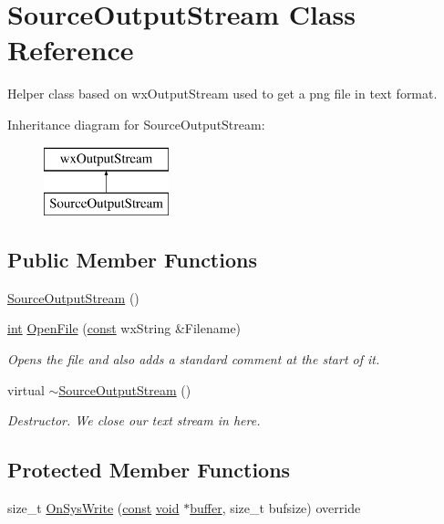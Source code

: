 \hypertarget{class_source_output_stream}{}\section{Source\+Output\+Stream Class Reference}
\label{class_source_output_stream}


Helper class based on wx\+Output\+Stream used to get a png file in text format.  


Inheritance diagram for Source\+Output\+Stream\+:\begin{figure}[H]
\begin{center}
\leavevmode
\includegraphics[height=2.000000cm]{class_source_output_stream}
\end{center}
\end{figure}
\subsection*{Public Member Functions}
\begin{DoxyCompactItemize}
\item 
\hyperlink{class_source_output_stream_a50b63abf252028635e21ec023ea20be6}{Source\+Output\+Stream} ()
\item 
\hyperlink{xmltok_8h_a5a0d4a5641ce434f1d23533f2b2e6653}{int} \hyperlink{class_source_output_stream_a5f00474aad7b930f29f3f8e42411a8a0}{Open\+File} (\hyperlink{getopt1_8c_a2c212835823e3c54a8ab6d95c652660e}{const} wx\+String \&Filename)
\begin{DoxyCompactList}\small\item\em Opens the file and also adds a standard comment at the start of it. \end{DoxyCompactList}\item 
virtual \hyperlink{class_source_output_stream_aab99721105b1c0ce232e161b06f9135d}{$\sim$\+Source\+Output\+Stream} ()
\begin{DoxyCompactList}\small\item\em Destructor. We close our text stream in here. \end{DoxyCompactList}\end{DoxyCompactItemize}
\subsection*{Protected Member Functions}
\begin{DoxyCompactItemize}
\item 
size\+\_\+t \hyperlink{class_source_output_stream_a208288b1bf9d8a9e2c56828c71c4025a}{On\+Sys\+Write} (\hyperlink{getopt1_8c_a2c212835823e3c54a8ab6d95c652660e}{const} \hyperlink{sound_8c_ae35f5844602719cf66324f4de2a658b3}{void} $\ast$\hyperlink{structbuffer}{buffer}, size\+\_\+t bufsize) override
\end{DoxyCompactItemize}

